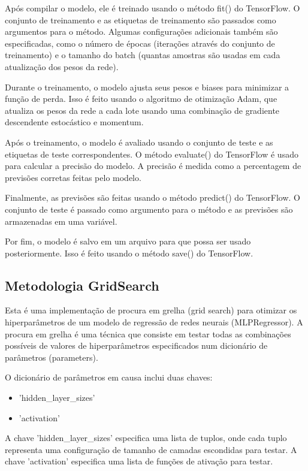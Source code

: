 \documentclass[10pt]{article}
\begin{document}
Após compilar o modelo, ele é treinado usando o método fit() do TensorFlow. 
O conjunto de treinamento e as etiquetas de treinamento 
são passados como argumentos para o método. Algumas configurações adicionais 
também são especificadas, como o número de épocas 
(iterações através do conjunto de treinamento) e o tamanho do batch 
(quantas amostras são usadas em cada atualização dos pesos da rede).

Durante o treinamento, o modelo ajusta seus pesos e biases para minimizar 
a função de perda. Isso é feito usando o algoritmo de otimização Adam, 
que atualiza os pesos da rede a cada lote usando uma combinação de 
gradiente descendente estocástico e momentum.

Após o treinamento, o modelo é avaliado usando o conjunto de teste 
e as etiquetas de teste correspondentes. O método evaluate() do TensorFlow 
é usado para calcular a precisão do modelo. A precisão é medida como a 
percentagem de previsões corretas feitas pelo modelo.

Finalmente, as previsões são feitas usando o método predict() do TensorFlow. 
O conjunto de teste é passado como argumento para o método e as previsões 
são armazenadas em uma variável.

Por fim, o modelo é salvo em um arquivo para que possa ser usado 
posteriormente. Isso é feito usando o método save() do TensorFlow.

\subsection{Metodologia GridSearch}
Esta é uma implementação de procura em grelha (grid search) para otimizar 
os hiperparâmetros de um modelo de regressão de redes neurais (MLPRegressor). 
A procura em grelha é uma técnica que consiste em testar todas as combinações 
possíveis de valores de hiperparâmetros especificados num dicionário 
de parâmetros (parameters).

O dicionário de parâmetros em causa inclui duas chaves:
\begin{itemize}
  \item 'hidden\_layer\_sizes'
  \item 'activation'
\end{itemize} 

A chave 'hidden\_layer\_sizes' especifica uma lista de tuplos, 
onde cada tuplo representa uma configuração de tamanho de camadas escondidas
para testar. A chave 'activation' especifica uma lista de funções de ativação 
para testar.
\end{document}

